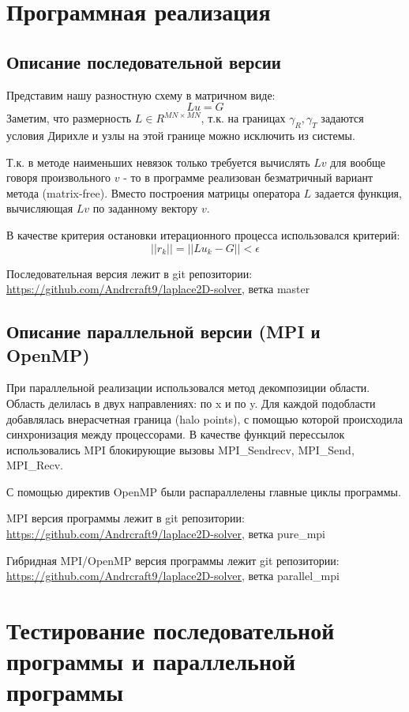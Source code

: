 \documentclass[12pt]{article}
\begin{document}
\newpage 

\section{Программная реализация}
\subsection{Описание последовательной версии}
Представим нашу разностную схему в матричном виде:
$$ L u = G $$
Заметим, что размерность $L \in R^{MN \times MN}$, т.к. на границах $\gamma_R, \gamma_T$ задаются условия Дирихле
и узлы на этой границе можно исключить из системы.

Т.к. в методе наименьших невязок только требуется вычислять $Lv$ для вообще говоря произвольного
$v$ - то в программе реализован безматричный вариант метода (matrix-free). 
Вместо построения матрицы оператора $L$ задается функция, вычисляющая $Lv$ по заданному вектору $v$.

В качестве критерия остановки итерационного процесса использовался критерий: 
$$||r_k|| = ||Lu_k - G|| < \epsilon $$

Последовательная версия лежит в git репозитории: 
\url{https://github.com/Andrcraft9/laplace2D-solver}, ветка master

\subsection{Описание параллельной версии (MPI и OpenMP)}
При параллельной реализации использовался метод декомпозиции области.
Область делилась в двух направлениях: по x и по y.
Для каждой подобласти добавлялась внерасчетная граница (halo points), 
с помощью которой происходила синхронизация между процессорами.
В качестве функций перессылок использовались MPI блокирующие вызовы 
MPI\_Sendrecv, MPI\_Send, MPI\_Recv.

С помощью директив OpenMP были распараллелены главные циклы программы.

\bigskip

MPI версия программы лежит в git репозитории: 
\url{https://github.com/Andrcraft9/laplace2D-solver}, ветка pure\_mpi

Гибридная MPI/OpenMP версия программы лежит git репозитории: 
\url{https://github.com/Andrcraft9/laplace2D-solver}, ветка parallel\_mpi

\newpage

\section{Тестирование последовательной программы и параллельной программы}
\end{document}
